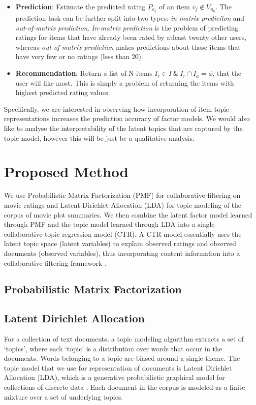 \documentclass{article} %
\begin{document}
\begin{itemize}[leftmargin=*]

\item[] {\bf Prediction}: Estimate the predicted rating $P_{a_{j}}$ of an
item $v_{j} \notin V_{u_{a}}$. The prediction task can be further split into
two types: \textit{in-matrix prediciton} and \textit{out-of-matrix prediction}. 
\textit{In-matrix prediction} is the problem of predicting ratings for items
that have already been rated by atleast twenty other users, whereas 
\textit{out-of-matrix prediction} makes predictions about those items that have
very few or no ratings (less than 20).

\item[] {\bf Recommendation}: Return a list of N items $I_{r} \in I \:\&\: I_{r} \cap I_{a} = \phi$, that the user will like most. This is simply a problem of
returning the items with highest predicted rating values.

\end{itemize}

Specifically, we are interested in observing how incorporation of item topic 
representations increases the prediction accuracy of factor models. We would
also like to analyse the interpretability of the latent topics that are 
captured by the topic model, however this will be just be a qualitative 
analysis.

\section{Proposed Method}
\label{gen_inst}

We use Probabilistic Matrix Factorization (PMF) for collaborative filtering on 
movie ratings and Latent Dirichlet Allocation (LDA) for topic modeling of the 
corpus of movie plot summaries. We then combine the latent factor model learned
through PMF and the topic model learned through LDA into a single
collaborative topic regression model (CTR). A CTR model essentially uses the
latent topic space (latent variables) to explain observed ratings and observed 
documents (observed variables), thus incorporating content information into a 
collaborative filtering framework \cite{ctr}.

\subsection{Probabilistic Matrix Factorization}


\subsection{Latent Dirichlet Allocation}
For a collection of text documents, a topic modeling algorithm extracts a set of
`topics', where each `topic' is a distribution over words that occur in the
documents. Words belonging to a topic are biased around a single theme. The
topic model that we use for representation of documents is Latent Dirichlet 
Allocation (LDA), which is a
generative probabilistic graphical model for collections of discrete data \cite{lda}. Each document in the corpus is modeled as a finite mixture over a set of 
underlying topics.
\end{document}

